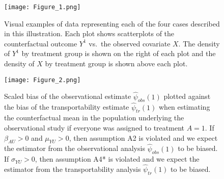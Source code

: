\documentclass[11pt]{article}
\begin{document}
\begin{figure}[h]
    \centering
   
     \texttt{[image: Figure\_1.png]}
     
    \caption{Visual examples of data representing each of the four cases described in this illustration. Each plot shows scatterplots of the counterfactual outcome $Y^1$ vs.~the observed covariate $X$. The density of $Y^1$ by treatment group is shown on the right of each plot and the density of $X$ by treatment group is shown above each plot.}
   
    \label{fig:fourcaseplot}
\end{figure}


\begin{figure}[h]
    \centering
   
     \texttt{[image: Figure\_2.png]}
    \caption{Scaled bias of the observational estimate $\widehat\psi_{obs}(1)$ plotted against the bias of the transportability estimate $\widehat\psi_{tr}(1)$ when estimating the counterfactual mean in the population underlying the observational study if everyone was assigned to treatment $A=1$. If $\beta_{AU}>0$ and $\mu_{YU}>0$, then assumption A2 is violated and we expect the estimator from the observational analysis $\widehat\psi_{obs}(1)$ to be biased. If $\sigma_{YU}>0$, then assumption A4* is violated and we expect the estimator from the transportability analysis $\widehat\psi_{tr}(1)$ to be biased.}
    \label{fig:bias_plot_fig1}
\end{figure}
\end{document}

